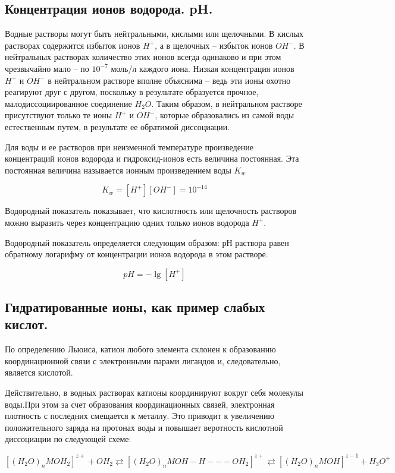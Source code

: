 \documentclass[14pt,a4paper]{scrartcl}
\begin{document}
\subsection*{Концентрация ионов водорода. pH.}

Водные растворы могут быть нейтральными, кислыми или щелочными. В кислых растворах содержится избыток ионов $H^+$, а в щелочных – избыток ионов $OH^-$. В нейтральных растворах количество этих ионов всегда одинаково и при этом чрезвычайно мало – по $10^{-7}$ моль/л каждого иона. Низкая концентрация ионов $H^+$ и $OH^-$ в нейтральном растворе вполне объяснима – ведь эти ионы охотно реагируют друг с другом, поскольку в результате образуется прочное, малодиссоциированное соединение $H_2O$. Таким образом, в нейтральном растворе присутствуют только те ионы $H^+$ и $OH^-$, которые образовались из самой воды естественным путем, в результате ее обратимой диссоциации.

Для воды и ее растворов при неизменной температуре произведение концентраций ионов водорода и гидроксид-ионов есть величина постоянная. Эта постоянная величина называется ионным произведением воды $K_w$

$$K_w = \left[H^+\right]\left[OH^-\right] = 10^{-14}$$

Водородный показатель показывает, что кислотность или щелочность растворов можно выразить через концентрацию одних только ионов водорода $H^+$.

Водородный показатель определяется следующим образом: рН раствора равен обратному логарифму от концентрации ионов водорода в этом растворе.

$$pH = -\lg\left[H^+\right]$$

\subsection*{Гидратированные ионы, как пример слабых кислот.}


По определению Льюиса, катион любого элемента склонен к образованию координационной связи с электронными парами лигандов и, следовательно, является кислотой.

Действительно, в водных растворах катионы координируют вокруг себя молекулы воды.При этом за счет образования координационных связей, электронная плотность с последних смещается к металлу. Это приводит к увеличению положительного заряда на протонах воды и повышает веротность кислотной диссоциации по следующей схеме:

$$\left[(H_2O)_n MOH_2\right]^{z+} + OH_2 \rightleftarrows \left[(H_2O)_n MOH-H---OH_2\right]^{z+} \rightleftarrows \left[(H_2O)_n MOH\right]^{z-1} + H_3O^+$$
\end{document}
